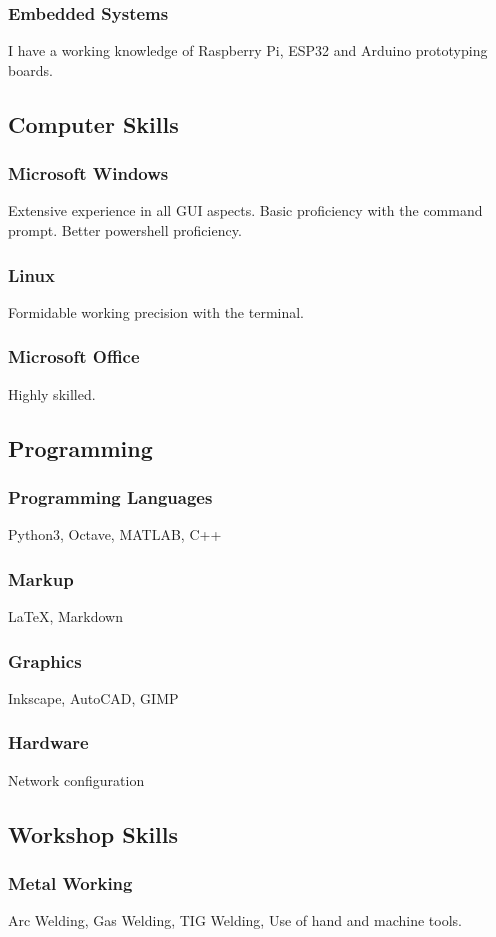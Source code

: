\documentclass[a4paper]{article}
\begin{document}
\subsubsection{Embedded Systems}
I have a working knowledge of Raspberry Pi, ESP32 and Arduino prototyping boards.

\subsection{Computer Skills}
\subsubsection{Microsoft Windows}
Extensive experience in all GUI aspects. Basic proficiency with the command prompt. Better powershell proficiency.
\subsubsection{Linux}
Formidable working precision with the terminal.
\subsubsection{Microsoft Office}
Highly skilled.

\subsection{Programming}
\subsubsection{Programming Languages}
Python3, Octave, MATLAB, C++
\subsubsection{Markup}
\LaTeX, Markdown
\subsubsection{Graphics}
Inkscape, AutoCAD, GIMP
\subsubsection{Hardware}
Network configuration

\subsection{Workshop Skills}
\subsubsection{Metal Working}
Arc Welding, Gas Welding, TIG Welding, Use of hand and machine tools.
\end{document}

